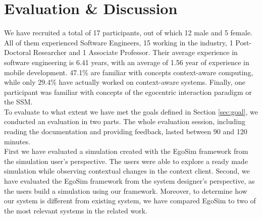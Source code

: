 \chapter{Evaluation \& Discussion}\label{ch:evaluation}
We have recruited a total of 17 participants, out of which 12 male and 5 female. All of them experienced Software Engineers, 15 working in the industry, 1 Post-Doctoral Researcher and 1 Associate Professor. Their average experience in software engineering is 6.41 years, with an average of 1.56 year of experience in mobile development. 47.1\% are familiar with concepts context-aware computing, while only 29.4\% have actually worked on context-aware systems. Finally, one participant was familiar with concepts of the egocentric interaction paradigm or the SSM.\\

To evaluate to what extent we have met the goals defined in Section \ref{sec:goal}, we conducted an evaluation in two parts. The whole evaluation session, including reading the documentation and providing feedback, lasted between 90 and 120 minutes.\\

First we have evaluated a simulation created with the EgoSim framework from the simulation user's perspective. The users were able to explore a ready made simulation while observing contextual changes in the context client. Second, we have evaluated the EgoSim framework from the system designer's perspective, as the users build a simulation using our framework. Moreover, to determine how our system is different from existing system, we have compared EgoSim to two of the most relevant systems in the related work.\\





